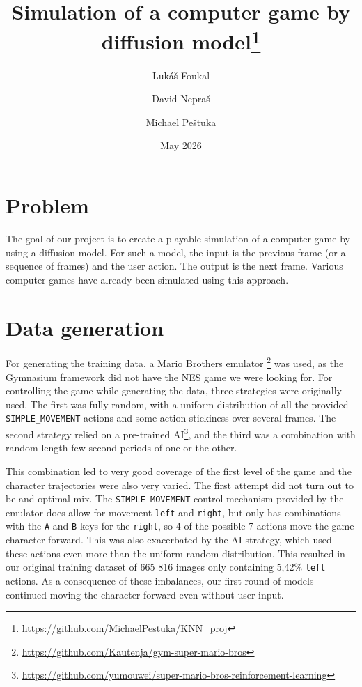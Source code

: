 \documentclass[twocolumn,a4paper]{article}
\title{Simulation of a computer game by diffusion model\footnote{\url{https://github.com/MichaelPestuka/KNN_proj}}}
\author{
  Lukáš Foukal \and
  David Nepraš \and
  Michael Peštuka
}
\date{May 2026}
\begin{document}
\maketitle

\section{Problem}
The goal of our project is to create a playable simulation of a computer game by using a diffusion model. For such a model, the input is the previous frame (or a sequence of frames) and the user action. The output is the next frame. Various computer games have already been simulated using this approach.

\section{Data generation} \label{data-generation}

For generating the training data, a Mario Brothers emulator \footnote{\url{https://github.com/Kautenja/gym-super-mario-bros}} was used, as the Gymnasium framework did not have the NES game we were looking for. For controlling the game while generating the data, three strategies were originally used. The first was fully random, with a uniform distribution of all the provided \texttt{SIMPLE\_MOVEMENT} actions and some action stickiness over several frames. The second strategy relied on a pre-trained AI\footnote{\url{https://github.com/yumouwei/super-mario-bros-reinforcement-learning}}, and the third was a combination with random-length few-second periods of one or the other.

This combination led to very good coverage of the first level of the game and the character trajectories were also very varied. The first attempt did not turn out to be and optimal mix. The \texttt{SIMPLE\_MOVEMENT} control mechanism provided by the emulator does allow for movement \texttt{left} and \texttt{right}, but only has combinations with the \texttt{A} and \texttt{B} keys for the \texttt{right}, so 4 of the possible 7 actions move the game character forward. This was also exacerbated by the AI strategy, which used these actions even more than the uniform random distribution. This resulted in our original training dataset of 665 816 images only containing 5,42\% \texttt{left} actions. As a consequence of these imbalances, our first round of models continued moving the character forward even without user input.
\end{document}

